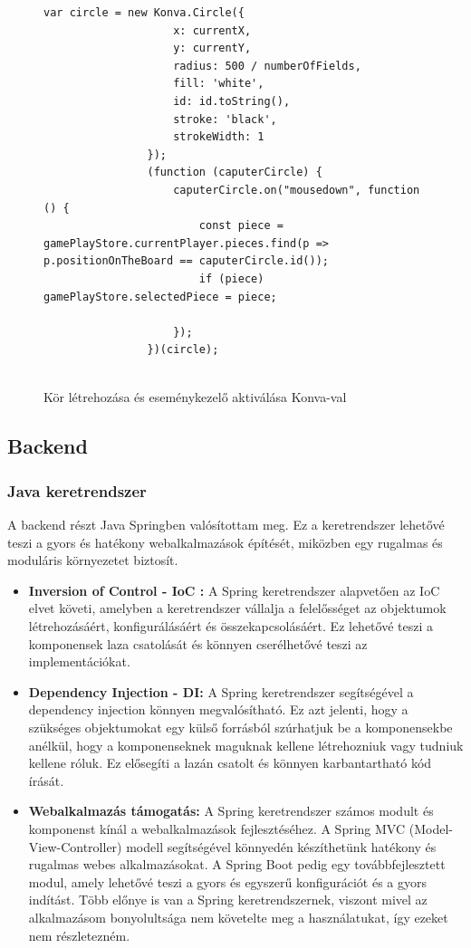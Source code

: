 \documentclass[a4paper,twoside]{article}
\begin{document}
\begin{figure}
	\caption{Kör létrehozása és eseménykezelő aktiválása Konva-val}
	
		\begin{minipage}{\textwidth}
			\begin{lstlisting}[style=javascriptStyle]
				var circle = new Konva.Circle({
					x: currentX,
					y: currentY,
					radius: 500 / numberOfFields,
					fill: 'white',
					id: id.toString(),
					stroke: 'black',
					strokeWidth: 1
				});
				(function (caputerCircle) {
					caputerCircle.on("mousedown", function () {
						const piece = gamePlayStore.currentPlayer.pieces.find(p => p.positionOnTheBoard == caputerCircle.id());
						if (piece) gamePlayStore.selectedPiece = piece;
						
					});
				})(circle);
				
			\end{lstlisting}
		\end{minipage}
	
	\label{konva}
\end{figure} 

\subsection{Backend}

\subsubsection{Java keretrendszer}
A backend részt Java Springben valósítottam meg. Ez a keretrendszer lehetővé teszi a gyors és hatékony
webalkalmazások építését, miközben egy rugalmas és moduláris környezetet biztosít.
\begin{itemize}
	\item  \textbf{Inversion of Control - IoC \cite{ioc}:} A Spring keretrendszer alapvetően az IoC elvet követi,
	amelyben a keretrendszer vállalja a felelősséget az objektumok létrehozásáért,
	konfigurálásáért és összekapcsolásáért. Ez lehetővé teszi a komponensek laza
	csatolását és könnyen cserélhetővé teszi az implementációkat.
	\item \textbf{Dependency Injection - DI:} A Spring keretrendszer segítségével a dependency
	injection könnyen megvalósítható. Ez azt jelenti, hogy a szükséges objektumokat egy
	külső forrásból szúrhatjuk be a komponensekbe anélkül, hogy a komponenseknek
	maguknak kellene létrehozniuk vagy tudniuk kellene róluk. Ez elősegíti a lazán
	csatolt és könnyen karbantartható kód írását.
	\item \textbf{Webalkalmazás támogatás:} A Spring keretrendszer számos modult és komponenst
	kínál a webalkalmazások fejlesztéséhez. A Spring MVC (Model-View-Controller)
	modell segítségével könnyedén készíthetünk hatékony és rugalmas webes
	alkalmazásokat. A Spring Boot pedig egy továbbfejlesztett modul, amely lehetővé
	teszi a gyors és egyszerű konfigurációt és a gyors indítást. Több előnye is van a Spring
	keretrendszernek, viszont mivel az alkalmazásom bonyolultsága nem követelte meg a
	használatukat, így ezeket nem részletezném.
\end{itemize}
\end{document}

